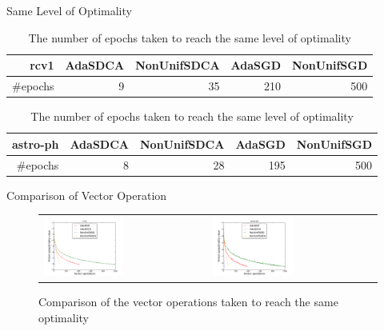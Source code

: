 \begin{frame}{Same Level of Optimality}
\begin{table}[htbp]
    \centering
    \caption{The number of epochs taken to reach the same level of optimality}
    \label{table:timetable}
    \begin{tabular}{|r|r|r|r|r|}
        \hline 
        rcv1 & AdaSDCA & NonUnifSDCA & AdaSGD & NonUnifSGD \\
        \hline
        \#epochs & 9 & 35 & 210 & 500 \\         
        \hline
    \end{tabular}
    \begin{tabular}{|r|r|r|r|r|}
        \hline 
        astro-ph & AdaSDCA & NonUnifSDCA & AdaSGD & NonUnifSGD \\
        \hline
        \#epochs & 8 & 28 & 195 & 500 \\         
        \hline
    \end{tabular}    
\end{table}
\end{frame}

\begin{frame}{Comparison of Vector Operation}
\begin{figure}[htbp]
\begin{tabular}{ll}
    \centering
        \includegraphics[width=0.5\textwidth]{images/comp_adas_vector_rcv1.pdf} &
        \includegraphics[width=0.5\textwidth]{images/comp_adas_vector_astro.pdf}
\end{tabular}
        \caption{Comparison of the vector operations taken to reach the same optimality}
     \label{fig:vectorop}
\end{figure}
\end{frame}

